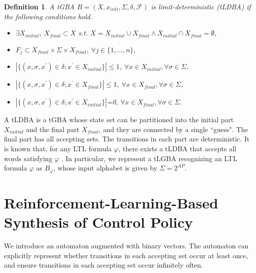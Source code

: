 \documentclass[letterpaper, 10 pt, conference]{ieeeconf}  %
\newtheorem{definition}{Definition}
\begin{document}
\begin{definition}
  A tGBA $B = (X, x_{init},\Sigma,\delta,\mathcal{F})$ is limit-deterministic (tLDBA) if the following conditions hold.
  \begin{itemize}
    \item $\exists X_{initial},\ X_{final} \subset X$ s.t. $X=X_{initial} \cup X_{final} \land X_{initial} \cap X_{final} = \emptyset$,
    \item $F_j \subset X_{final} \times \Sigma \times X_{final}$, $\forall j \in \{ 1,...,n \}$,
    \item $| \{ (x, \sigma, x^{\prime}) \! \in \! \delta; x^{\prime} \! \in \! X_{initial} \} | \! \leq \! 1$, $\forall x \! \in \! X_{initial}, \forall \sigma \! \in \! \Sigma$,
    \item $| \{ (x, \sigma, x^{\prime}) \in \delta; x^{\prime} \in X_{final} \} | \! \leq \! 1$, $\forall x \! \in \! X_{final}, \forall \sigma \! \in \! \Sigma$,
    \item $| \{ (x, \sigma, x^{\prime}) \in \delta; x^{\prime} \in X_{initial} \} |$=0, $\forall x \! \in \! X_{final}, \forall \sigma \! \in \! \Sigma$.
  \end{itemize}
\end{definition}
A tLDBA is a tGBA whose state set can be partitioned into the initial part $X_{initial}$ and the final part $X_{final}$, and they are connected by a single ``guess". The final part has all accepting sets. The transitions in each part are deterministic.
It is known that, for any LTL formula $ \varphi $, there exists a tLDBA that accepts all words satisfying $\varphi$ \cite{SEJK2016}.
In particular, we represent a tLGBA recognizing an LTL formula $\varphi$ as $B_{\varphi}$, whose input alphabet is given by $ \Sigma = 2^{AP} $.

\section{Reinforcement-Learning-Based Synthesis of Control Policy}
We introduce an automaton augmented with binary vectors. The automaton can explicitly represent whether transitions in each accepting set occur at least once, and ensure transitions in each accepting set occur infinitely often.
\end{document}
